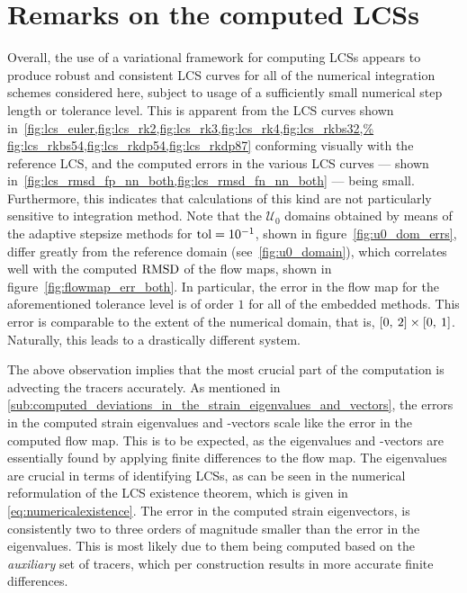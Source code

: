 \section{Remarks on the computed LCSs}
\label{sec:general_remarks}

Overall, the use of a variational framework for computing LCSs appears to
produce robust and consistent LCS curves for all of the numerical integration
schemes considered here, subject to usage of a sufficiently small numerical
step length or tolerance level. This is apparent from the LCS curves shown
in~\cref{fig:lcs_euler,fig:lcs_rk2,fig:lcs_rk3,fig:lcs_rk4,fig:lcs_rkbs32,%
fig:lcs_rkbs54,fig:lcs_rkdp54,fig:lcs_rkdp87} conforming visually with the
reference LCS, and the computed errors in the various LCS curves --- shown
in~\cref{fig:lcs_rmsd_fp_nn_both,fig:lcs_rmsd_fn_nn_both} --- being small.
Furthermore, this indicates that calculations of this kind
are not particularly sensitive to integration method. Note that the
$\mathcal{U}_{0}$ domains obtained by means of the adaptive stepsize methods
for $\textnormal{tol}=10^{-1}$, shown in figure~\ref{fig:u0_dom_errs}, differ
greatly from the reference domain (see~\cref{fig:u0_domain}), which correlates
well with the computed $\operatorname{RMSD}$ of the flow maps, shown in
figure~\ref{fig:flowmap_err_both}. In particular, the error in the flow map for
the aforementioned tolerance level is of order $1$ for all of the embedded
methods. This error is comparable to the extent of the numerical domain, that
is, $[0,\hspace{0.5ex}2]\times[0,\hspace{0.5ex}1]$. Naturally, this leads to a
drastically different system.

The above observation implies that the most crucial part of the computation is
advecting the tracers accurately. As mentioned in
\cref{sub:computed_deviations_in_the_strain_eigenvalues_and_vectors}, the errors
in the computed strain eigenvalues and -vectors scale like the error in the
computed flow map. This is to be expected, as the eigenvalues and -vectors are
essentially found by applying finite differences to the flow map. The
eigenvalues are crucial in terms of identifying LCSs, as can be seen in the
numerical reformulation of the LCS existence theorem, which is given in
\cref{eq:numericalexistence}. The error in the computed strain eigenvectors, is
consistently two to three orders of magnitude smaller than the error in the
eigenvalues. This is most likely due to them being computed based on the %
\emph{auxiliary} set of tracers, which per construction results in more accurate
finite differences.

